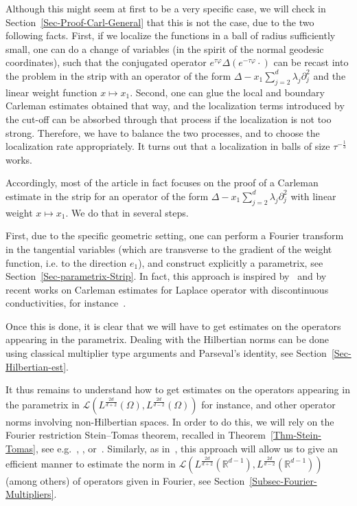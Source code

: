 \documentclass[10pt]{amsart}
\theoremstyle{definition}\newtheorem{defi}[theo]{Definition}\newtheorem{rema}[theo]{Remark}\newtheorem{exam}[theo]{Example}\newtheorem{exem}[theo]{Example}\newtheorem{nota}[theo]{Notation}
\newcommand{\scL}{\mathscr{L}}
\newcommand*\R{\mathbb{R}}
\begin{document}
Although this might seem at first to be a very specific case, we will check in Section~\ref{Sec-Proof-Carl-General} that this is not the case, due to the two following facts. First, if we localize the functions in a ball of radius sufficiently small, one can do a change of variables (in the spirit of the normal geodesic coordinates), such that the conjugated operator $e^{\tau \varphi} \Delta\left(e^{-\tau \varphi}\cdot \right)$ can be recast into the problem in the strip with an operator of the form $\Delta - x_1 \sum_{j = 2}^d \lambda_j \partial_{j}^2$ and the linear weight function $x\mapsto x_1$. Second, one can glue the local and boundary Carleman estimates obtained that way, and the localization terms introduced by the cut-off can be absorbed through that process if the localization is not too strong. Therefore, we have to balance the two processes, and to choose the localization rate appropriately. It turns out that a localization in balls of size $\tau^{-\frac{1}{3}}$ works.

Accordingly, most of the article in fact focuses on the proof of a Carleman estimate in the strip for an operator of the form $\Delta - x_1 \sum_{j = 2}^d \lambda_j \partial_{j}^2$ with linear weight $x \mapsto x_1$. We do that in several steps.

First, due to the specific geometric setting, one can perform a Fourier transform in the tangential variables (which are transverse to the gradient of the weight function, i.e. to the direction $e_1$), and construct explicitly a parametrix, see Section~\ref{Sec-parametrix-Strip}. In fact, this approach is inspired by~\cite{koch2001carleman,
Sogge1989uniquecontinuation} and by recent works on Carleman estimates for Laplace operator with discontinuous conductivities, for instance~\cite{LeRousseau2013interface}.

Once this is done, it is clear that we will have to get estimates on the operators appearing in the parametrix. Dealing with the Hilbertian norms can be done using classical multiplier type arguments and Parseval's identity, see Section~\ref{Sec-Hilbertian-est}.

It thus remains to understand how to get estimates on the operators appearing in the parametrix in $\scL(L^{\frac{2d}{d+2}}(\Omega),L^{\frac{2d}{d-2}}(\Omega)) $ for instance, and other operator norms involving non-Hilbertian spaces. In order to do this, we will rely on the Fourier restriction Stein--Tomas theorem, recalled in Theorem~\ref{Thm-Stein-Tomas}, see e.g.~\cite{tomas1975restriction}, \cite[Theorem~2, p.~352]{stein1993harmonic}, or~\cite[Corollary~2.2.2]{sogge2017fourier}. Similarly, as in~\cite{barcelo1988weighted,kenig1987uniform}, this approach will allow us to give an efficient manner to estimate the norm in $\scL(L^{\frac{2d}{d+2}}(\R^{d-1}),L^{\frac{2d}{d-2}}(\R^{d-1})) $ (among others) of operators given in Fourier, see Section~\ref{Subsec-Fourier-Multipliers}.
\end{document}
